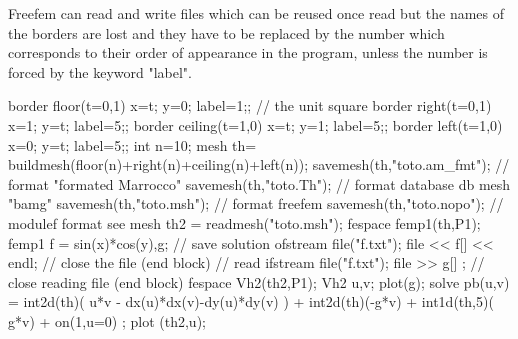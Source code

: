 \documentclass[twoside]{book}
\newif\ifpdf
\begin{document}
\graphicspath{{./}{plots/}}
\ifpdf
\DeclareGraphicsExtensions{.pdf, .jpg, .tif}
\else
{}
\fi

\let\subsubsection\subsection
\let\subsection\section
\let\section\chapter



Freefem can read and write files which can be reused once read but the
names of the borders are lost and they have to be replaced by the number
which corresponds to their order of appearance in the program, unless
the number is forced by the keyword "label".
\bFF

border floor(t=0,1){ x=t; y=0; label=1;}; // the unit square
border right(t=0,1){ x=1; y=t; label=5;};
border ceiling(t=1,0){ x=t; y=1; label=5;};
border left(t=1,0){ x=0; y=t; label=5;};
int n=10;
mesh th= buildmesh(floor(n)+right(n)+ceiling(n)+left(n));
savemesh(th,"toto.am_fmt");  // format "formated Marrocco" 
savemesh(th,"toto.Th");      // format database  db mesh "bamg"   
savemesh(th,"toto.msh");     // format freefem 
savemesh(th,"toto.nopo");     // modulef format  see \cite{nopo}
mesh th2 = readmesh("toto.msh");
fespace femp1(th,P1);
femp1 f = sin(x)*cos(y),g;
{ // save solution
ofstream file("f.txt");
file << f[] << endl;
}  // close the file (end block)
{  // read
ifstream file("f.txt");
file >> g[] ;
} // close reading file (end block)
fespace Vh2(th2,P1);
Vh2 u,v;
plot(g);
solve pb(u,v) =
    int2d(th)( u*v - dx(u)*dx(v)-dy(u)*dy(v) )
  + int2d(th)(-g*v)
  + int1d(th,5)( g*v)
  + on(1,u=0) ;
plot (th2,u);
\eFF
\end{document}
